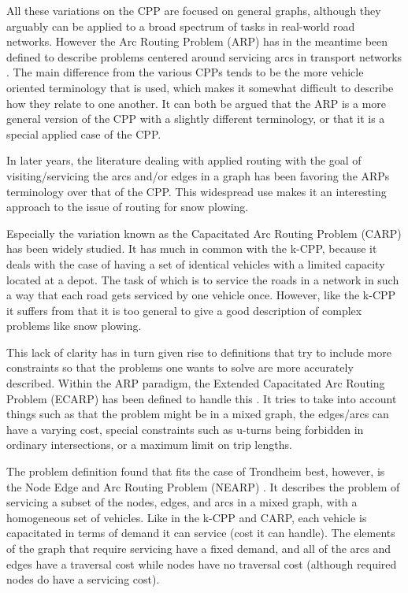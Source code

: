 All these variations on the CPP are focused on general graphs, although they arguably can be applied to a broad spectrum of tasks in real-world road networks. However the Arc Routing Problem (ARP) has in the meantime been defined to describe problems centered around servicing arcs in transport networks \citep{eiselt1995ARP}. The main difference from the various CPPs tends to be the more vehicle oriented terminology that is used, which makes it somewhat difficult to describe how they relate to one another. It can both be argued that the ARP is a more general version of the CPP with a slightly different terminology, or that it is a special applied case of the CPP.

In later years, the literature dealing with applied routing with the goal of visiting/servicing the arcs and/or edges in a graph has been favoring the ARPs terminology over that of the CPP. This widespread use makes it an interesting approach to the issue of routing for snow plowing.

Especially the variation known as the Capacitated Arc Routing Problem (CARP) \citep{ulusoy1985CARP} has been widely studied. It has much in common with the k-CPP, because it deals with the case of having a set of identical vehicles with a limited capacity located at a depot. The task of which is to service the roads in a network in such a way that each road gets serviced by one vehicle once. However, like the k-CPP it suffers from that it is too general to give a good description of complex problems like snow plowing.

This lack of clarity has in turn given rise to definitions that try to include more constraints so that the problems one wants to solve are more accurately described. Within the ARP paradigm, the Extended Capacitated Arc Routing Problem (ECARP) has been defined to handle this \citep{lacomme2004competitiveMA}. It tries to take into account things such as that the problem might be in a mixed graph, the edges/arcs can have a varying cost, special constraints such as u-turns being forbidden in ordinary intersections, or a maximum limit on trip lengths.

The problem definition found that fits the case of Trondheim best, however, is the Node Edge and Arc Routing Problem (NEARP) \citep{prins2005memeticNEARP}. It describes the problem of servicing a subset of the nodes, edges, and arcs in a mixed graph, with a homogeneous set of vehicles. Like in the k-CPP and CARP, each vehicle is capacitated in terms of demand it can service (cost it can handle). The elements of the graph that require servicing have a fixed demand, and all of the arcs and edges have a traversal cost while nodes have no traversal cost (although required nodes do have a servicing cost).

